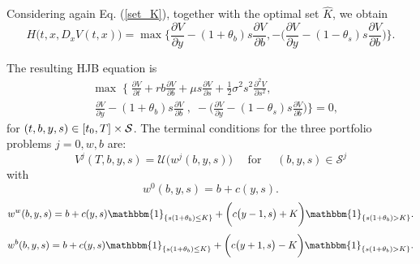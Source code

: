 Considering again Eq. (\ref{set_K}), together with the optimal set $\hat K$,
we obtain
$$ H \bigl(t,x, D_x V(t,x) \bigr) = \max \biggl\{ \frac{\partial V}{\partial y}-(1+\theta_b) s \frac{\partial V}{\partial b} ,
 -\bigl( \frac{\partial V}{\partial y} -(1-\theta_s)s \frac{\partial V}{\partial b} \bigr) \biggr\}. $$

\noindent 
The resulting HJB equation is
\begin{align}\label{DPZ_HJB}
& \max \; \biggl\{ \; \frac{\partial V}{\partial t} + rb\frac{\partial V}{\partial b} 
+ \mu s \frac{\partial V}{\partial s} + \frac{1}{2}\sigma^2 s^2 \frac{\partial^2 V}{\partial s^2}, \\ \nonumber
& \;  \frac{\partial V}{\partial y}-(1+\theta_b) s \frac{\partial V}{\partial b} \; 
, \; -\biggl(\frac{\partial V}{\partial y}-(1-\theta_s)s \frac{\partial V}{\partial b} \biggr) \biggr\} = 0, 
\end{align}
for $(t,b,y,s) \in [t_0,T] \times \mathcal{S}$.
The terminal conditions for the three portfolio problems $j=0,w,b$ are:
\begin{equation}\label{terminal_conditions}
V^j(T,b,y,s) = \mathcal{U}\bigl( w^j(b,y,s) \bigr) \hspace{1em} \mbox{ for } \hspace{1em} (b,y,s) \in \mathcal{S}^j 
\end{equation}
with
  \begin{equation*}
   w^0(b,y,s) =  b + c(y,s).
  \end{equation*}
  \begin{equation*}
   w^w(b,y,s) =  b + c(y,s) \mathbbm{1}_{\{ s(1+\theta_b) \leq K\}} +
  \biggl( c\bigl( y-1,s \bigr) + K \biggr) \mathbbm{1}_{\{s(1+\theta_b)>K\}}.
  \end{equation*}
  \begin{equation*}
   w^b(b,y,s) = b + c(y,s) \mathbbm{1}_{\{ s(1+\theta_b) \leq K\}} +
  \biggl( c\bigl( y+1,s \bigr) - K \biggr) \mathbbm{1}_{\{s(1+\theta_b)>K\}}.
  \end{equation*}

